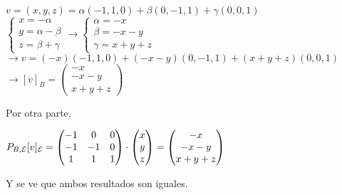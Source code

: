 \begin{enumerate}
\begin{mdframed}[style=s]
                \begin{center}
                    $v=(x,y,z)=\alpha(-1,1,0)+\beta(0,-1,1)+\gamma(0,0,1)$\\
                    $\begin{cases}
                        x=-\alpha\\
                        y=\alpha-\beta\\
                        z=\beta+\gamma
                    \end{cases}\to\begin{cases}
                        \alpha=-x\\
                        \beta=-x-y\\
                        \gamma=x+y+z
                    \end{cases}$\\
                    $\to v=(-x)(-1,1,0)+(-x-y)(0,-1,1)+(x+y+z)(0,0,1)$\\
                    $\to [v]_B=\begin{pmatrix}
                        -x\\-x-y\\x+y+z
                    \end{pmatrix}$
                \end{center}
                Por otra parte,
                \begin{center}
                    $P_{B,\mathcal{E}}[v]_{\mathcal{E}}=\begin{pmatrix}
                        -1&0&0\\-1&-1&0\\1&1&1
                    \end{pmatrix}\cdot\begin{pmatrix}
                        x\\y\\z
                    \end{pmatrix}=\begin{pmatrix}
                        -x\\-x-y\\x+y+z
                    \end{pmatrix}$
                \end{center}
                Y se ve que ambos resultados son iguales.
            \end{mdframed}
    \end{enumerate}